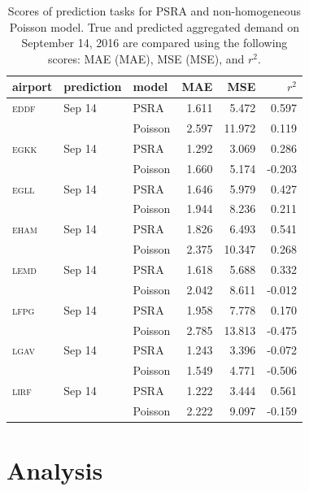 \documentclass[draft,review]{elsarticle}
\newcommand{\airp}[1]{\textcolor{#1}{\textsc{#1}}}
\begin{document}
\begin{table}
  \centering
  \caption{Scores of prediction tasks for \acs{PSRA} and non-homogeneous Poisson model. True and predicted aggregated demand on September 14, 2016 are compared using the following scores: \acl{MAE} (\acs{MAE}), \acl{MSE} (\acs{MSE}), and \(r^2\).}\label{tab:predictions_last_day}
  \begin{tabular}{lllrrr}
    \toprule
    airport    & prediction & model & \acs{MAE} & \acs{MSE} & \(r^2\)  \\
    \midrule
    \airp{eddf} & Sep 14    & \acs{PSRA} &  1.611 &   5.472 &  0.597 \\
         &                  & Poisson    &  2.597 &  11.972 &  0.119 \\
    \airp{egkk} & Sep 14    & \acs{PSRA} &  1.292 &   3.069 &  0.286 \\
         &                  & Poisson    &  1.660 &   5.174 & -0.203 \\
    \airp{egll} & Sep 14    & \acs{PSRA} &  1.646 &   5.979 &  0.427 \\
         &                  & Poisson    &  1.944 &   8.236 &  0.211 \\
    \airp{eham} & Sep 14    & \acs{PSRA} &  1.826 &   6.493 &  0.541 \\
         &                  & Poisson    &  2.375 &  10.347 &  0.268 \\
    \airp{lemd} & Sep 14    & \acs{PSRA} &  1.618 &   5.688 &  0.332 \\
         &                  & Poisson    &  2.042 &   8.611 & -0.012 \\
    \airp{lfpg} & Sep 14    & \acs{PSRA} &  1.958 &   7.778 &  0.170 \\
         &                  & Poisson    &  2.785 &  13.813 & -0.475 \\
    \airp{lgav} & Sep 14    & \acs{PSRA} &  1.243 &   3.396 & -0.072 \\
         &                  & Poisson    &  1.549 &   4.771 & -0.506 \\
    \airp{lirf} & Sep 14    & \acs{PSRA} &  1.222 &   3.444 &  0.561 \\
         &                  & Poisson    &  2.222 &   9.097 & -0.159 \\
    \bottomrule
  \end{tabular}
\end{table}

\section{Analysis}\label{sec:analysis}
\end{document}

